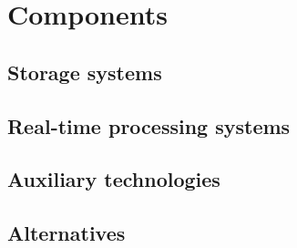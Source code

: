 \chapter{Components}
\label{chap:components}

\section{Storage systems}





\section{Real-time processing systems}





\section{Auxiliary technologies}







\section{Alternatives}






